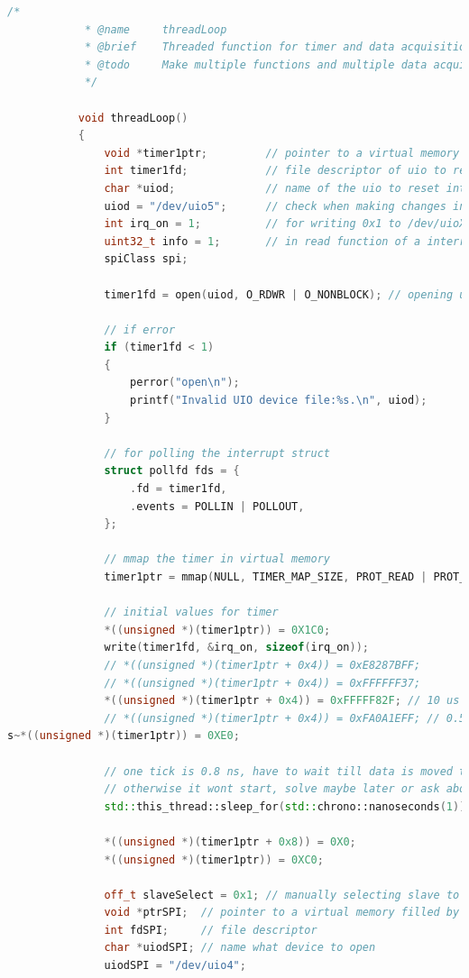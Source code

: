 \documentclass[a4paper, twoside, 11pt]{article}
\begin{document}
		\begin{lstlisting}[language={c++}, caption={threadLoop() funkce, běžící ve vedlejším vlákně backgroundThread. Z~důvodu úspory místa byla vynechána část kódu \gls{abbreviation:spi} jednotky.}, label={lst:thread-loop-code}]
			/*
			* @name     threadLoop
			* @brief    Threaded function for timer and data acquisition.
			* @todo     Make multiple functions and multiple data acquisitions paralel but use data only when data from all sources all valid.
			*/
		   
		   void threadLoop()
		   {
			   void *timer1ptr;         // pointer to a virtual memory filled by mmap
			   int timer1fd;            // file descriptor of uio to reset interrupt in /proc/interrupts
			   char *uiod;              // name of the uio to reset interrupts
			   uiod = "/dev/uio5";      // check when making changes in a platform
			   int irq_on = 1;          // for writing 0x1 to /dev/uioX
			   uint32_t info = 1;       // in read function of a interrupt checking
			   spiClass spi;

			   timer1fd = open(uiod, O_RDWR | O_NONBLOCK); // opening uioX device
		   
			   // if error
			   if (timer1fd < 1)
			   {
				   perror("open\n");
				   printf("Invalid UIO device file:%s.\n", uiod);
			   }
		   
			   // for polling the interrupt struct
			   struct pollfd fds = {
				   .fd = timer1fd,
				   .events = POLLIN | POLLOUT,
			   };
		   
			   // mmap the timer in virtual memory
			   timer1ptr = mmap(NULL, TIMER_MAP_SIZE, PROT_READ | PROT_WRITE, MAP_SHARED, timer1fd, 0);
		   
			   // initial values for timer
			   *((unsigned *)(timer1ptr)) = 0X1C0;
			   write(timer1fd, &irq_on, sizeof(irq_on));
			   // *((unsigned *)(timer1ptr + 0x4)) = 0xE8287BFF;
			   // *((unsigned *)(timer1ptr + 0x4)) = 0xFFFFFF37;
			   *((unsigned *)(timer1ptr + 0x4)) = 0xFFFFF82F; // 10 us
			   // *((unsigned *)(timer1ptr + 0x4)) = 0xFA0A1EFF; // 0.5
s~*((unsigned *)(timer1ptr)) = 0XE0;
		   
			   // one tick is 0.8 ns, have to wait till data is moved to counter register
			   // otherwise it wont start, solve maybe later or ask about it
			   std::this_thread::sleep_for(std::chrono::nanoseconds(1));
		   
			   *((unsigned *)(timer1ptr + 0x8)) = 0X0;
			   *((unsigned *)(timer1ptr)) = 0XC0;
		   
			   off_t slaveSelect = 0x1; // manually selecting slave to make active
			   void *ptrSPI;  // pointer to a virtual memory filled by mmap
			   int fdSPI;     // file descriptor
			   char *uiodSPI; // name what device to open
			   uiodSPI = "/dev/uio4";
		   

\end{lstlisting}
\end{document}
